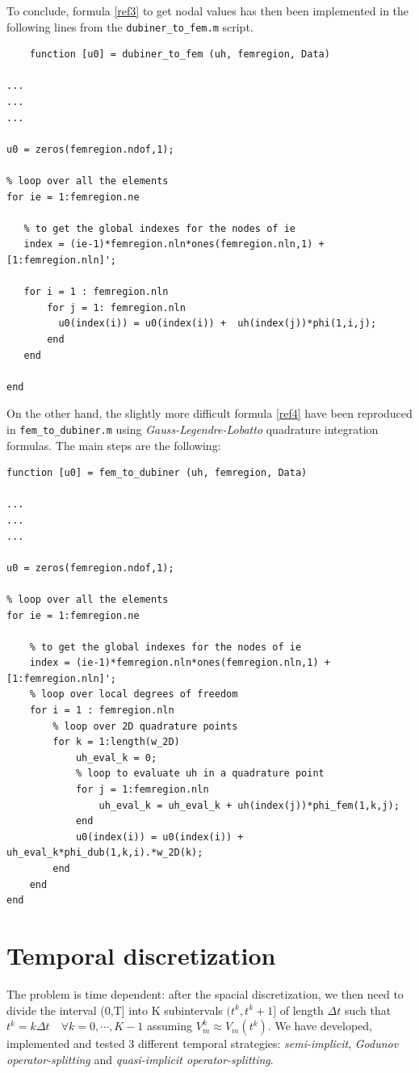 \documentclass[a4paper,11pt]{article}
\begin{document}
	\noindent To conclude, formula \ref{ref3} to get nodal values has then been implemented in the following lines from the \texttt{dubiner\_to\_fem.m} script. 
	\begin{verbatim}
	function [u0] = dubiner_to_fem (uh, femregion, Data)  
	       
...
...
...

u0 = zeros(femregion.ndof,1);

% loop over all the elements
for ie = 1:femregion.ne
   
   % to get the global indexes for the nodes of ie 
   index = (ie-1)*femregion.nln*ones(femregion.nln,1) + [1:femregion.nln]';
   
   for i = 1 : femregion.nln
       for j = 1: femregion.nln
         u0(index(i)) = u0(index(i)) +  uh(index(j))*phi(1,i,j);
       end
   end
    
end
\end{verbatim}
\vspace{5mm}
\noindent On the other hand, the slightly more difficult formula \ref{ref4} have been reproduced in \texttt{fem\_to\_dubiner.m} using \emph{Gauss-Legendre-Lobatto} quadrature integration formulas. The main steps are the following:
\begin{verbatim}
function [u0] = fem_to_dubiner (uh, femregion, Data)

...
...
...

u0 = zeros(femregion.ndof,1);

% loop over all the elements
for ie = 1:femregion.ne

    % to get the global indexes for the nodes of ie 
    index = (ie-1)*femregion.nln*ones(femregion.nln,1) + [1:femregion.nln]';
    % loop over local degrees of freedom
    for i = 1 : femregion.nln
        % loop over 2D quadrature points
        for k = 1:length(w_2D) 
            uh_eval_k = 0;
            % loop to evaluate uh in a quadrature point
            for j = 1:femregion.nln
                uh_eval_k = uh_eval_k + uh(index(j))*phi_fem(1,k,j);
            end
            u0(index(i)) = u0(index(i)) + uh_eval_k*phi_dub(1,k,i).*w_2D(k);
        end
    end    
end
\end{verbatim}
\newpage
\section{Temporal discretization}
The problem is time dependent: after the spacial discretization, we then need to divide the interval (0,T] into K subintervals $(t^k,t^k+1]$ of length $\Delta t$ such that $t^k=k \Delta t \quad \forall k=0,\cdots,K-1$ assuming $V_m^k\approx V_m(t^k)$. We have developed, implemented and tested 3 different temporal strategies: \emph{semi-implicit}, \emph{Godunov operator-splitting} and \emph{quasi-implicit operator-splitting}. 
\end{document}
